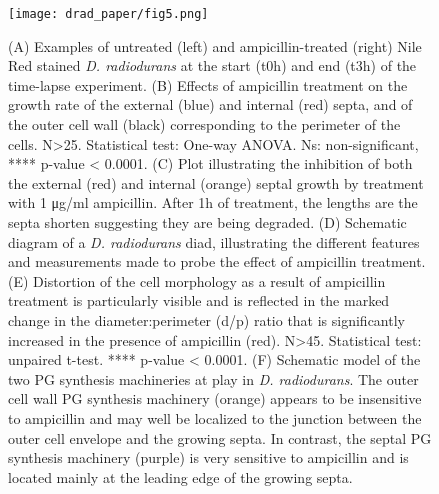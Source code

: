 \begin{figure}
    \centering
    \texttt{[image: drad\_paper/fig5.png]}
    \label{drad_fig5}
\end{figure}
\begin{figure}
    \ContinuedFloat
    \caption[]{(A) Examples of untreated (left) and ampicillin-treated (right) Nile Red stained \textit{D. radiodurans} at the start (t0h) and end (t3h) of the time-lapse experiment. (B) Effects of ampicillin treatment on the growth rate of the external (blue) and internal (red) septa, and of the outer cell wall (black) corresponding to the perimeter of the cells. N>25. Statistical test: One-way ANOVA. Ns: non-significant, **** p-value < 0.0001. (C) Plot illustrating the inhibition of both the external (red) and internal (orange) septal growth by treatment with 1 μg/ml ampicillin. After 1h of treatment, the lengths are the septa shorten suggesting they are being degraded. (D) Schematic diagram of a \textit{D. radiodurans} diad, illustrating the different features and measurements made to probe the effect of ampicillin treatment. (E) Distortion of the cell morphology as a result of ampicillin treatment is particularly visible and is reflected in the marked change in the diameter:perimeter (d/p) ratio that is significantly increased in the presence of ampicillin (red). N>45. Statistical test: unpaired t-test. **** p-value < 0.0001. (F) Schematic model of the two PG synthesis machineries at play in \textit{D. radiodurans}. The outer cell wall PG synthesis machinery (orange) appears to be insensitive to ampicillin and may well be localized to the junction between the outer cell envelope and the growing septa. In contrast, the septal PG synthesis machinery (purple) is very sensitive to ampicillin and is located mainly at the leading edge of the growing septa.}
\end{figure}

